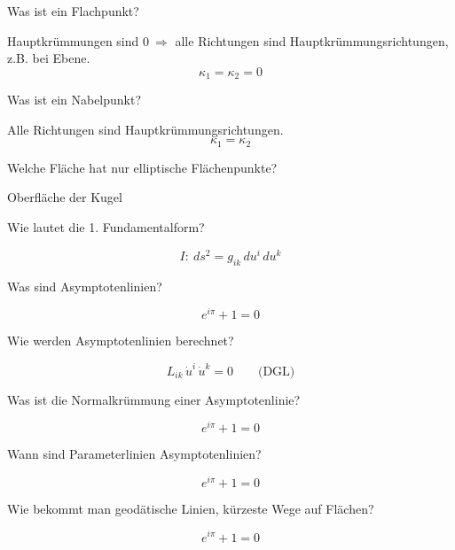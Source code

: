 \documentclass[twocolumn, fontsize=8pt, DIV=1]{scrartcl}
\begin{document}
\begin{framed}
    Was ist ein Flachpunkt?
\end{framed}
Hauptkrümmungen sind $0\ \Rightarrow$ alle Richtungen sind Hauptkrümmungsrichtungen, z.B. bei Ebene.
\[
    \kappa_1 = \kappa_2 = 0
\]



\begin{framed}
    Was ist ein Nabelpunkt?
\end{framed}
Alle Richtungen sind Hauptkrümmungsrichtungen.
\[
    \kappa_1 = \kappa_2
\]



\begin{framed}
    Welche Fläche hat nur elliptische Flächenpunkte?
\end{framed}
Oberfläche der Kugel



\begin{framed}
    Wie lautet die 1. Fundamentalform?
\end{framed}
\[
    I: \ ds^2 = g_{ik}\, du^i\, du^k
\]



\begin{framed}
    Was sind Asymptotenlinien?
\end{framed}
\[
    e^{i\pi} + 1 = 0
\]



\begin{framed}
    Wie werden Asymptotenlinien berechnet?
\end{framed}
\[
    L_{ik}\,\dot{u}^i\,\dot{u}^k = 0 \qquad \text{(DGL)}
\]



\begin{framed}
    Was ist die Normalkrümmung einer Asymptotenlinie?
\end{framed}
\[
    e^{i\pi} + 1 = 0
\]



\begin{framed}
    Wann sind Parameterlinien Asymptotenlinien?
\end{framed}
\[
    e^{i\pi} + 1 = 0
\]



\begin{framed}
    Wie bekommt man geodätische Linien, kürzeste Wege auf Flächen?
\end{framed}
\[
    e^{i\pi} + 1 = 0
\]
\end{document}

